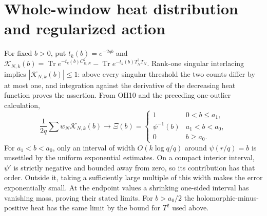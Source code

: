 \documentclass[11pt]{article}
\newcommand{\Tr}{\operatorname{Tr}}\newcommand{\diag}{\operatorname{diag}}
\begin{document}
\section{Whole-window heat distribution and regularized action}
For fixed $b>0$, put $t_k(b)=e^{-2qb}$ and
$\mathscr K_{N,k}(b)=\Tr e^{-t_k(b)C_{B,N}^2}
-\Tr e^{-t_k(b)T_N^\dagger T_N}$. Rank-one singular interlacing
implies $|\mathscr K_{N,k}(b)|\le1$: above every singular threshold
the two counts differ by at most one, and integration against the
derivative of the decreasing heat function proves the assertion.
From OH10 and the preceding one-outlier calculation,
\begin{equation}\tag{OH17}
 \frac1{2q}\sum w_N\mathscr K_{N,k}(b)\longrightarrow
 \Xi(b)=\begin{cases}1&0<b\le a_1,\\
                  \psi^{-1}(b)&a_1<b<a_0,\\0&b\ge a_0.
             \end{cases}
\end{equation}
For $a_1<b<a_0$, only an interval of width $O(k\log q/q)$ around
$\psi(r/q)=b$ is unsettled by the uniform exponential estimates.
On a compact interior interval, $\psi'$ is strictly negative and
bounded away from zero, so its contribution has that order. Outside
it, taking a sufficiently large multiple of this width makes the
error exponentially small. At the endpoint values a shrinking
one-sided interval has vanishing mass, proving their stated limits.
For $b>a_0/2$ the holomorphic-minus-positive heat has the same limit
by the bound for $T^2$ used above.
\end{document}
